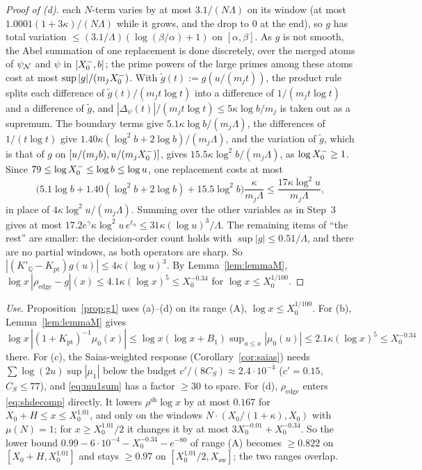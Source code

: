 \begin{proof}[Proof of (d)]
each $N$-term varies by at most $3.1/(N\Lambda)$ on its window (at most $1.0001(1+3\kappa)/(N\Lambda)$ while it grows, and the drop
to $0$ at the end), so $g$ has total variation $\le(3.1/\Lambda)(\log(\beta/\alpha)+1)$ on $[\alpha,\beta]$.
As $g$ is not smooth, the Abel summation of one replacement is done discretely, over the merged atoms of $\psi_{\mathcal{N}}$ and $\psi$ in
$[X_0^{-},b]$; the prime powers of the large primes among these atoms cost at most $\sup|g|/(m_jX_0^{-})$. With
$\tilde g(t):=g(u/(m_jt))$, the product rule splits each difference of $\tilde g(t)/(m_jt\log t)$ into a
difference of $1/(m_jt\log t)$ and a difference of $\tilde g$, and $|\Delta_\psi(t)|/(m_jt\log t)\le5\kappa\log b/m_j$ is taken
out as a supremum. The boundary terms give $5.1\kappa\log b/(m_j\Lambda)$, the differences of $1/(t\log t)$ give
$1.40\kappa(\log^2b+2\log b)/(m_j\Lambda)$, and the variation of $\tilde g$, which is that of $g$ on $[u/(m_jb),u/(m_jX_0^{-})]$, gives
$15.5\kappa\log^2b/(m_j\Lambda)$, as $\log X_0^{-}\ge1$. Since $79\le\log X_0^{-}\le\log b\le\log u$, one replacement costs at most
\[
  \bigl(5.1\log b+1.40(\log^2b+2\log b)+15.5\log^2b\bigr)\frac{\kappa}{m_j\Lambda}\le\frac{17\kappa\log^2u}{m_j\Lambda},
\]
in place of $4\kappa\log^2u/(m_j\Lambda)$. Summing over the other variables as in Step~3 gives at most
$17.2e^{\gamma}\kappa\log^2u\,e^{\ell_u}\le31\kappa(\log u)^3/\Lambda$. The remaining items of ``the rest'' are smaller: the
decision-order count holds with $\sup|g|\le0.51/\Lambda$, and there are no partial windows, as both operators are sharp. So
$|(K'_{\mathbb Q}-K_{\mathrm{pt}})g(u)|\le4\kappa(\log u)^3$. By
Lemma~\ref{lem:lemmaM}, $\log x\,|\rho_{\mathrm{edge}}-g|(x)\le4.1\kappa(\log x)^5\le X_0^{-0.34}$ for $\log x\le X_0^{1/100}$.
\end{proof}

\emph{Use.} Proposition~\ref{prop:g1} uses (a)--(d) on its range (A), $\log x\le X_0^{1/100}$. For (b), Lemma~\ref{lem:lemmaM} gives
$\log x\,|(1+K_{\mathrm{pt}})^{-1}\mu_0(x)|\le\log x(\log x+B_1)\sup_{u\le x}|\mu_0(u)|\le2.1\kappa(\log x)^5\le X_0^{-0.34}$ there. For (c),
the Saias-weighted response (Corollary~\ref{cor:saias}) needs $\sum\log(2u)\sup|\mu_1|$ below the budget
$c'/(8C_S)\approx2.4\cdot10^{-4}$ ($c'=0.15$, $C_S\le77$), and
\eqref{eq:mu1sum} has a factor $\ge30$ to spare. For (d), $\rho_{\mathrm{edge}}$ enters \eqref{eq:shdecomp} directly. It lowers
$\rho^{\mathrm{sh}}\log x$ by at most $0.167$ for $X_0+H\le x\le X_0^{1.01}$, and only on the windows $N\cdot(X_0/(1+\kappa),X_0)$ with
$\mu(N)=1$; for $x\ge X_0^{1.01}/2$ it changes it by at most $3X_0^{-0.01}+X_0^{-0.34}$. So the lower bound
$0.99-6\cdot10^{-4}-X_0^{-0.34}-e^{-80}$ of range (A) becomes $\ge0.822$ on $[X_0+H,X_0^{1.01}]$ and stays $\ge0.97$ on
$[X_0^{1.01}/2,X_{\mathrm{sw}}]$; the two ranges overlap.

